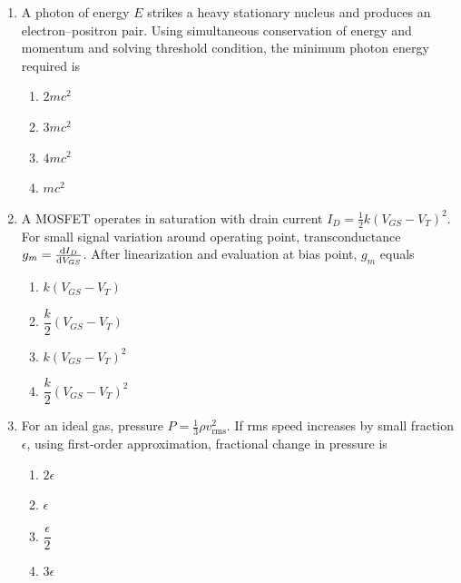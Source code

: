 \documentclass[12pt]{article}
\begin{document}
\begin{enumerate}[leftmargin=*]
\item A photon of energy $E$ strikes a heavy stationary nucleus and produces an electron–positron pair. Using simultaneous conservation of energy and momentum and solving threshold condition, the minimum photon energy required is

\begin{enumerate}
\item $2mc^2$
\item $3mc^2$
\item $4mc^2$
\item $mc^2$
\end{enumerate}

\item A MOSFET operates in saturation with drain current $I_D=\frac{1}{2}k(V_{GS}-V_T)^2$. For small signal variation around operating point, transconductance $g_m=\dv{I_D}{V_{GS}}$. After linearization and evaluation at bias point, $g_m$ equals

\begin{enumerate}
\item $k(V_{GS}-V_T)$
\item $\dfrac{k}{2}(V_{GS}-V_T)$
\item $k(V_{GS}-V_T)^2$
\item $\dfrac{k}{2}(V_{GS}-V_T)^2$
\end{enumerate}

\item For an ideal gas, pressure $P=\frac{1}{3}\rho v_{\text{rms}}^2$. If rms speed increases by small fraction $\epsilon$, using first-order approximation, fractional change in pressure is

\begin{enumerate}
\item $2\epsilon$
\item $\epsilon$
\item $\dfrac{\epsilon}{2}$
\item $3\epsilon$
\end{enumerate}

\end{enumerate}
\end{document}
